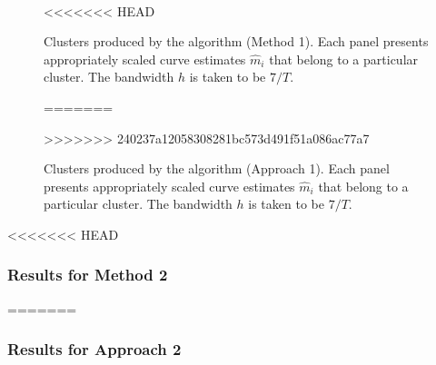 \documentclass[a4paper,12pt]{article}
\numberwithin{equation}{section}
\begin{document}
\begin{figure}
\\
\hspace{0.25cm}
<<<<<<< HEAD
\caption{Clusters produced by the algorithm (Method 1). Each panel presents appropriately scaled curve estimates $\hat{m}_i$ that belong to a particular cluster. The bandwidth $h$ is taken to be $7/T$.}\label{fig:clusters_14days}
=======
\caption{Clusters produced by the algorithm (Approach 1). Each panel presents appropriately scaled curve estimates $\hat{m}_i$ that belong to a particular cluster. The bandwidth $h$ is taken to be $7/T$.}\label{fig:clusters_14days}
>>>>>>> 240237a12058308281bc573d491f51a086ac77a7
\vspace{1cm}

\end{figure}

<<<<<<< HEAD

\FloatBarrier 


\subsubsection{Results for Method 2}


=======

\FloatBarrier 


\subsubsection{Results for Approach 2}
\end{document}
